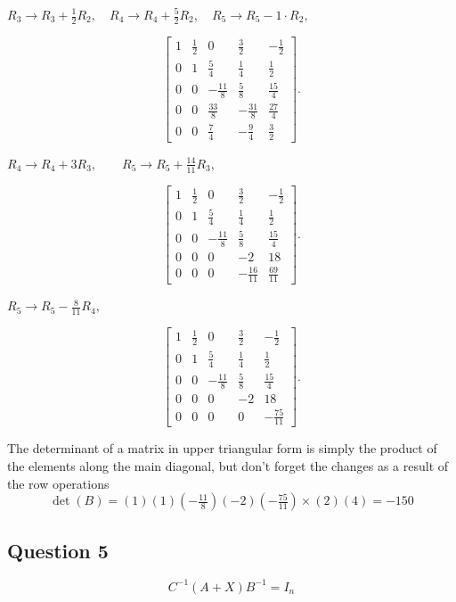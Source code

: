 \documentclass{article}
\begin{document}
\(
R_3 \to R_3 + \tfrac{1}{2}R_2,\quad
R_4 \to R_4 + \tfrac{5}{2}R_2,\quad
R_5 \to R_5 - 1\cdot R_2,
\)

\[
\begin{bmatrix}
1 & \tfrac{1}{2} & 0 & \tfrac{3}{2} & -\tfrac{1}{2} \\[5pt]
0 & 1 & \tfrac{5}{4} & \tfrac{1}{4} & \tfrac{1}{2} \\[5pt]
0 & 0 & -\tfrac{11}{8} & \tfrac{5}{8} & \tfrac{15}{4} \\[5pt]
0 & 0 & \tfrac{33}{8} & -\tfrac{31}{8} & \tfrac{27}{4} \\[5pt]
0 & 0 & \tfrac{7}{4} & -\tfrac{9}{4} & \tfrac{3}{2}
\end{bmatrix}.
\]

\(
R_4 \to R_4 + 3R_3,\qquad R_5 \to R_5 + \tfrac{14}{11}R_3,
\)

\[
\begin{bmatrix}
1 & \tfrac{1}{2} & 0 & \tfrac{3}{2} & -\tfrac{1}{2} \\[5pt]
0 & 1 & \tfrac{5}{4} & \tfrac{1}{4} & \tfrac{1}{2} \\[5pt]
0 & 0 & -\tfrac{11}{8} & \tfrac{5}{8} & \tfrac{15}{4} \\[5pt]
0 & 0 & 0 & -2 & 18 \\[5pt]
0 & 0 & 0 & -\tfrac{16}{11} & \tfrac{69}{11}
\end{bmatrix}.
\]

\(
R_5 \to R_5 - \tfrac{8}{11}R_4,
\)

\[
\begin{bmatrix}
1 & \tfrac{1}{2} & 0 & \tfrac{3}{2} & -\tfrac{1}{2} \\[5pt]
0 & 1 & \tfrac{5}{4} & \tfrac{1}{4} & \tfrac{1}{2} \\[5pt]
0 & 0 & -\tfrac{11}{8} & \tfrac{5}{8} & \tfrac{15}{4} \\[5pt]
0 & 0 & 0 & -2 & 18 \\[6pt]
0 & 0 & 0 & 0 & -\tfrac{75}{11}
\end{bmatrix}.
\]

The determinant of a matrix in upper triangular form is simply the product of the elements along the
main diagonal, but don't forget the changes as a result of the row operations
\[
\det(B) = \left(1\right)\left(1\right)\left(-\tfrac{11}{8}\right)\left(-2\right)\left(-\tfrac{75}{11}\right) \times (2)(4)
= -150
\]



\subsection*{Question 5}
\[
C^{-1}(A+X)B^{-1} = I_n
\]
\end{document}
